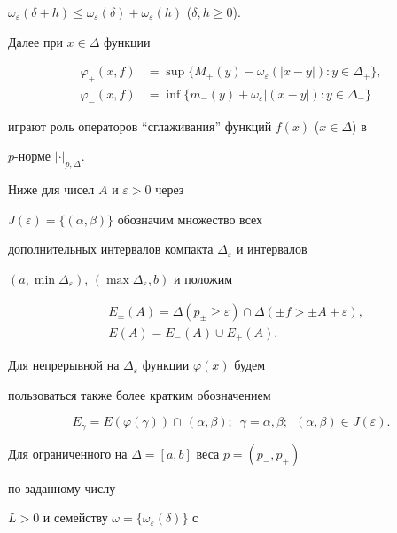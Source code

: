 $\omega_\varepsilon(\delta+h)\le\omega_\varepsilon(\delta)+


\omega_\varepsilon(h)$ ($\delta,h\ge 0$).


Далее при $x\in\Delta$ функции


\begin{align*}


\varphi_+(x,f)&=\sup\{M_+(y)-\omega_\varepsilon(|x-y|):


y\in\Delta_+\},\\


\varphi_-(x,f)&=\inf\{m_-(y)+\omega_\varepsilon|(x-y|):


y\in\Delta_-\}


\end{align*}


играют роль операторов ``сглаживания'' функций $f(x)$ ($x\in\Delta$) в


$p$-норме $|\cdot|_{p,\Delta}$.





Ниже для чисел $A$ и $\varepsilon>0$ через


$J(\varepsilon)=\{(\alpha,\beta)\}$ обозначим множество всех


дополнительных интервалов компакта $\Delta_\varepsilon$ и интервалов


$(a,\min\Delta_\varepsilon)$, $(\max\Delta_\varepsilon,b)$ и положим


\begin{align*}


& E_\pm(A)=\Delta(p_\pm\ge\varepsilon)\cap


\Delta(\pm f>\pm A+\varepsilon),\\


& E(A)=E_-(A)\cup E_+(A).


\end{align*}


Для непрерывной на $\Delta_\varepsilon$ функции $\varphi(x)$ будем


пользоваться также более кратким обозначением


$$


E_\gamma=E(\varphi(\gamma))\cap\,(\alpha,\beta);\ \;


\gamma=\alpha,\beta;\ \; (\alpha,\beta)\in J(\varepsilon).


$$


Для ограниченного на $\Delta=[a,b]$ веса $p=(p_-,p_+)$


по заданному числу


$L>0$ и семейству $\omega=\{\omega_\varepsilon(\delta)\}$ с


